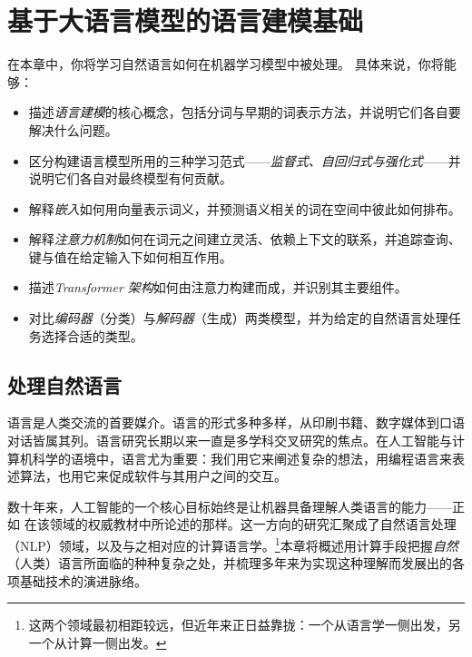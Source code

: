


\chapter[语言建模基础]{基于大语言模型的语言建模基础}\label{chap:llm}

\begin{learningbox}
在本章中，你将学习自然语言如何在机器学习模型中被处理。
具体来说，你将能够：
\begin{itemize}[leftmargin=*, nosep]
    \item 描述{\em 语言建模}的核心概念，包括分词与早期的词表示方法，并说明它们各自要解决什么问题。
    \item 区分构建语言模型所用的三种学习范式——{\em 监督式、自回归式与强化式}——并说明它们各自对最终模型有何贡献。
    \item 解释{\em 嵌入}如何用向量表示词义，并预测语义相关的词在空间中彼此如何排布。
    \item 解释{\em 注意力机制}如何在词元之间建立灵活、依赖上下文的联系，并追踪查询、键与值在给定输入下如何相互作用。
    \item 描述{\em Transformer 架构}如何由注意力构建而成，并识别其主要组件。
    \item 对比{\em 编码器}（分类）与{\em 解码器}（生成）两类模型，并为给定的自然语言处理任务选择合适的类型。
\end{itemize}
\end{learningbox}

\section{处理自然语言}\label{sec:processinglanguage}
语言是人类交流的首要媒介。语言的形式多种多样，从印刷书籍、数字媒体到口语对话皆属其列。语言研究长期以来一直是多学科交叉研究的焦点。在人工智能与计算机科学的语境中，语言尤为重要：我们用它来阐述复杂的想法，用编程语言来表述算法，也用它来促成软件与其用户之间的交互。

数十年来，人工智能的一个核心目标始终是让机器具备理解人类语言的能力——正如 \citet{jm3} 在该领域的权威教材中所论述的那样。这一方向的研究汇聚成了自然语言处理（NLP）领域，以及与之相对应的计算语言学。\footnote{这两个领域最初相距较远，但近年来正日益靠拢：一个从语言学一侧出发，另一个从计算一侧出发。}本章将概述用计算手段把握{\em 自然}（人类）语言所面临的种种复杂之处，并梳理多年来为实现这种理解而发展出的各项基础技术的演进脉络。

